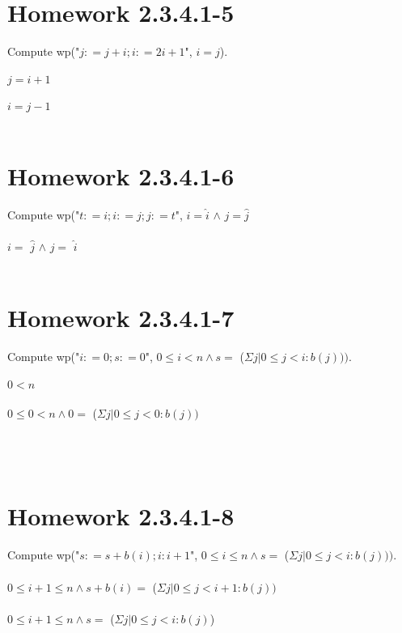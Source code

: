 \documentclass{article}
\begin{document}
\section{Homework 2.3.4.1-5}
Compute wp("$j : = j + i; i : = 2i + 1$", $i = j$).
\\
\\
$j = i + 1$
\\
\\
$ i = j - 1$
\\
\\
\section{Homework 2.3.4.1-6}
Compute wp("$t : = i; i : = j; j : = t$", $i = \hat{i}$ $\land$ $j = \hat{j}$
\\
\\
$i = $ $ \hat{j}$ $\land$ $ j = $ $ \hat{i}$
\\
\\
\section{Homework 2.3.4.1-7}
Compute wp("$i : = 0; s : = 0$", $0 \leq i < n \land s = $ ($\Sigma j | 0 \leq j < i : b(j)))$.
\\
\\
$ 0 < n$
\\
\\
$ 0 \leq 0 < n \land 0 = $ ($\Sigma j | 0 \leq j < 0 : b(j))$
\\
\\
\\
\\
\section{Homework 2.3.4.1-8}
Compute wp("$s : = s + b(i); i : i + 1$", $0 \leq i \leq n \land s = $ ($\Sigma j | 0 \leq j < i : b(j)))$.
\\
\\
$0 \leq i + 1 \leq n \land s + b(i) = $ ($\Sigma j | 0 \leq j < i + 1 : b(j))$
\\
\\
$0 \leq i + 1 \leq n \land s = $ ($\Sigma j | 0 \leq j < i : b(j)$)
\\
\\
\end{document}
